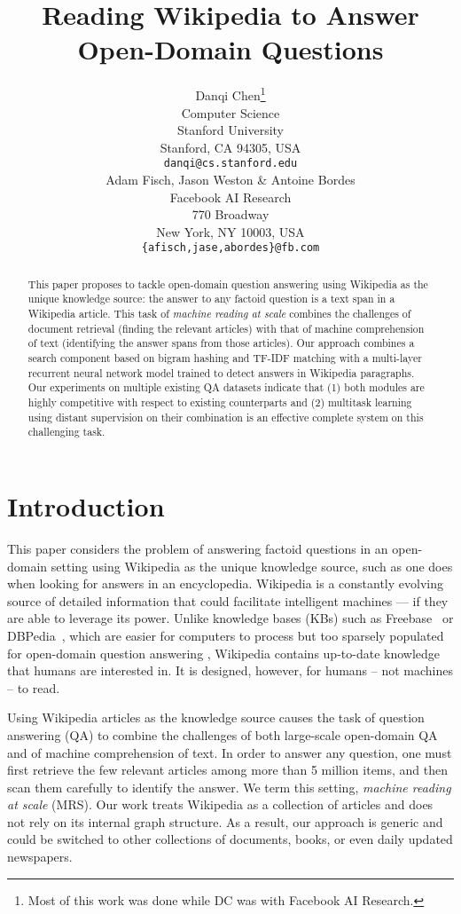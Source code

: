 \documentclass[11pt,a4paper]{article}
\title{Reading Wikipedia to Answer Open-Domain Questions}
\author{Danqi Chen\thanks{\hspace{0.3em} Most of this work was done while DC was with Facebook AI Research.} \\
Computer Science\\ 
Stanford University\\
Stanford, CA 94305, USA\\
  {\tt danqi@cs.stanford.edu} \\\And
Adam Fisch, Jason Weston \& Antoine Bordes\\
Facebook AI Research\\
770 Broadway\\
New York, NY 10003, USA\\
{\tt \{afisch,jase,abordes\}@fb.com} \\}
\date{}
\begin{document}
\maketitle
\begin{abstract}
This paper proposes to tackle open-domain question answering using Wikipedia as the unique knowledge source: the answer to any factoid question is a text span in a Wikipedia article. This task of {\it machine reading at scale} combines the challenges of document retrieval (finding the relevant articles) with that of machine comprehension of text (identifying the answer spans from those articles). Our approach combines a search component based on bigram hashing and TF-IDF matching  with a multi-layer recurrent neural network model trained to detect answers in Wikipedia paragraphs. Our experiments on multiple existing QA datasets indicate that (1) both modules are highly competitive with respect to existing counterparts and (2) multitask learning using distant supervision on their combination is an effective complete system on this challenging task.
\end{abstract}

\section{Introduction}

This paper considers the problem of answering factoid questions in an open-domain setting using Wikipedia as the unique knowledge source, such as one does when looking for answers in an encyclopedia.
%
Wikipedia is a constantly evolving source of detailed information that could facilitate intelligent machines  --- if they are able to leverage its power.
Unlike knowledge bases (KBs) such as Freebase~\cite{bollacker2008freebase} or DBPedia~\cite{auer2007dbpedia}, which are easier for computers to process but too sparsely populated for open-domain question answering \cite{miller2016key}, Wikipedia contains up-to-date knowledge that humans are interested in. It is designed, however, for humans -- not machines -- to read.
%
%

Using Wikipedia articles as the knowledge source causes the task of question answering (QA) to combine the challenges of both large-scale open-domain QA and of machine comprehension of text. In order to answer any question, one must first retrieve the few relevant articles among more than 5 million items, and then scan them carefully to identify the answer.
%
We term this setting, {\it machine reading at scale} (MRS).
%
Our work treats Wikipedia as a collection of articles and does not rely on its internal graph structure. As a result, our approach is generic and could be switched to other collections of documents, books, or even daily updated newspapers.
\end{document}
